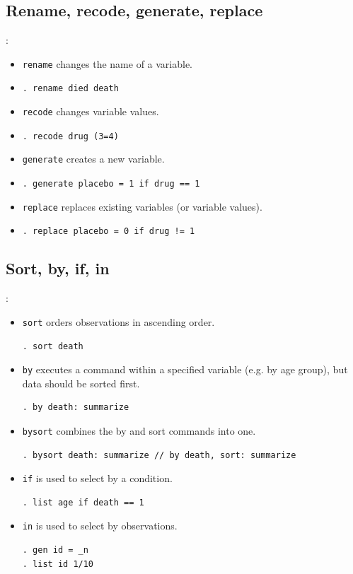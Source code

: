 \subsection{Rename, recode, generate, replace}
\begin{frame}[fragile]{\secname : \subsecname}
\begin{itemize}
\item 	\verb|rename| changes the name of a variable. 
\item[] \verb|. rename died death|
\item   \verb|recode| changes variable values.
\item[] \verb|. recode drug (3=4)|
\item   \verb|generate| creates a new variable.
\item[] \verb|. generate placebo = 1 if drug == 1|
\item   \verb|replace| replaces existing variables (or variable values).
\item[] \verb|. replace placebo = 0 if drug != 1|
\end{itemize}
\end{frame}

\subsection{Sort, by, if, in}
\begin{frame}[fragile]{\secname : \subsecname}
\begin{itemize}
	\item \verb|sort| orders observations in ascending order.\\
\begin{verbatim}
. sort death
\end{verbatim}
	\item \verb|by| executes a command within a specified variable (e.g. by age group), but data should be sorted first.
\begin{verbatim}
. by death: summarize
\end{verbatim}
	\item \verb|bysort| combines the by and sort commands into one.
\begin{verbatim}
. bysort death: summarize // by death, sort: summarize
\end{verbatim}
	\item \verb|if| is used to select by a condition.
\begin{verbatim}
. list age if death == 1
\end{verbatim}	

\item \verb|in| is used to select by observations.
\begin{verbatim}
. gen id = _n 
. list id 1/10
\end{verbatim}
\end{itemize}
\end{frame}

